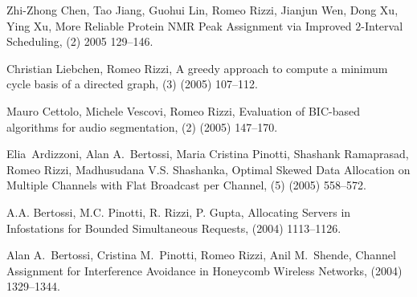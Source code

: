\begin{etaremune}
  \item {\sc Zhi-Zhong Chen, Tao Jiang, Guohui Lin, Romeo Rizzi,
                  Jianjun Wen, Dong Xu, Ying Xu},
   \newblock  More Reliable Protein NMR Peak Assignment via Improved $2$-Interval Scheduling,
   (2) 2005 129--146.

  \item {\sc Christian Liebchen, Romeo Rizzi},
   \newblock  A greedy approach to compute a minimum cycle basis
              of a directed graph,
   (3) (2005) 107--112.

  \item {\sc Mauro Cettolo, Michele Vescovi, Romeo Rizzi},
   \newblock  Evaluation of BIC-based algorithms for audio segmentation,
   (2) (2005) 147--170.

  \item {\sc Elia~Ardizzoni, Alan A.~Bertossi, Maria Cristina Pinotti,
                  Shashank Ramaprasad,  Romeo Rizzi,  Madhusudana V.S. Shashanka},
   \newblock  Optimal Skewed Data Allocation on Multiple Channels with Flat
              Broadcast per Channel,
   (5) (2005) 558--572.

  \item {\sc A.A. Bertossi, M.C. Pinotti, R. Rizzi, P. Gupta}, %
   \newblock  Allocating Servers in Infostations for Bounded Simultaneous Requests,
    (2004) 1113--1126.

  \item {\sc Alan A.~Bertossi, Cristina M.~Pinotti, Romeo Rizzi, Anil M.~Shende},
   \newblock  Channel Assignment for Interference Avoidance in Honeycomb Wireless Networks,
    (2004) 1329--1344.


\end{etaremune}
